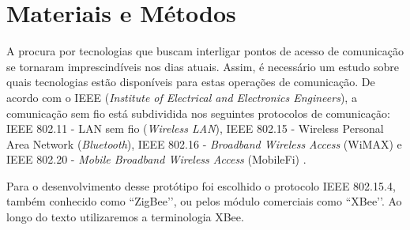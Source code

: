 \documentclass[12pt]{uftpibicsic2020}
\begin{document}
\chapter{Materiais e Métodos}\vskip -12pt

A procura por tecnologias que buscam interligar pontos de acesso de comunicação se tornaram imprescindíveis nos dias atuais. Assim, é necessário um estudo sobre quais tecnologias estão disponíveis para estas operações de comunicação. De acordo com o IEEE (\textit{Institute of Electrical and Electronics Engineers}), a comunicação sem fio está subdividida nos seguintes protocolos de comunicação: IEEE 802.11 - LAN sem fio ({\it Wireless LAN}), IEEE 802.15 - Wireless Personal Area Network ({\it Bluetooth}), IEEE 802.16 - {\it Broadband Wireless Access} (WiMAX) e IEEE 802.20 - {\it Mobile Broadband Wireless Access} (MobileFi) \cite{marcos}.

Para o desenvolvimento desse protótipo foi escolhido o protocolo IEEE 802.15.4, também conhecido como ``ZigBee’’, ou pelos módulo comerciais como ``XBee’’. Ao longo do texto utilizaremos a terminologia XBee.


%
%
\end{document}
